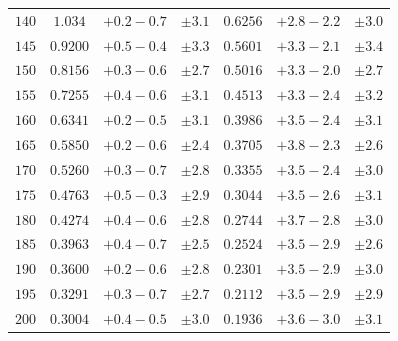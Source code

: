 \begin{table}
\begin{center}
\begin{tabular}{ccccccc}
$ 140 $ & $    1.034 $ & $   +0.2   -\!0.7  $ & 
$ \pm 3.1 $
 & $   0.6256 $ & $   +2.8   -\!2.2  $ &
$ \pm 3.0 $ \\[.2em]

$ 145 $ & $   0.9200 $ & $   +0.5   -\!0.4  $ & 
$ \pm 3.3 $
 & $   0.5601 $ & $   +3.3   -\!2.1  $ &
$ \pm 3.4 $ \\[.2em]

$ 150 $ & $   0.8156 $ &  $  +0.3   -\!0.6  $ & 
$ \pm 2.7 $
 & $   0.5016 $ & $   +3.3   -\!2.0  $ &
$ \pm 2.7 $ \\[.2em]

$ 155 $ & $   0.7255 $ &  $  +0.4   -\!0.6  $ & 
$ \pm 3.1 $
 & $   0.4513 $ & $   +3.3   -\!2.4  $ &
$ \pm 3.2 $ \\[.2em]

$ 160 $ & $   0.6341 $ &  $  +0.2   -\!0.5  $ & 
$ \pm 3.1 $
 & $   0.3986 $ & $   +3.5   -\!2.4  $ &
$ \pm 3.1 $ \\[.2em]

$ 165 $ & $   0.5850 $ &  $  +0.2   -\!0.6  $ & 
$ \pm 2.4 $
 & $   0.3705 $ & $   +3.8   -\!2.3  $ &
$ \pm 2.6 $ \\[.2em]

$ 170 $ & $   0.5260 $ &  $  +0.3   -\!0.7  $ & 
$ \pm 2.8 $
 & $   0.3355 $ & $   +3.5   -\!2.4  $ &
$ \pm 3.0 $ \\[.2em]

$ 175 $ & $   0.4763 $ &  $  +0.5   -\!0.3  $ & 
$ \pm 2.9 $
 & $   0.3044 $ & $   +3.5   -\!2.6  $ &
$ \pm 3.1 $ \\[.2em]

$ 180 $ & $   0.4274 $ & $   +0.4   -\!0.6  $ & 
$ \pm 2.8 $
 & $   0.2744 $ & $   +3.7   -\!2.8  $ &
$ \pm 3.0 $ \\[.2em]

$ 185 $ & $   0.3963 $ & $   +0.4   -\!0.7  $ & 
$ \pm 2.5 $
 & $   0.2524 $ & $   +3.5   -\!2.9  $ &
$ \pm 2.6 $ \\[.2em]

$ 190 $ & $   0.3600 $ & $   +0.2   -\!0.6  $ & 
$ \pm 2.8 $
 & $   0.2301 $ & $  +3.5   -\!2.9  $ &
$ \pm 3.0 $ \\[.2em]

$ 195 $ & $   0.3291 $ & $   +0.3   -\!0.7  $ & 
$ \pm 2.7 $
 & $   0.2112 $ & $  +3.5   -\!2.9  $ &
$ \pm 2.9 $ \\[.2em]

$ 200 $ & $   0.3004 $ & $   +0.4   -\!0.5  $ & 
$ \pm 3.0 $
 & $   0.1936 $ & $  +3.6   -\!3.0  $ &
$ \pm 3.1 $ \\[.2em]


\end{tabular}
\end{center}
\end{table}
